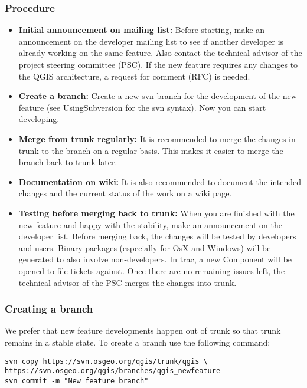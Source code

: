 \subsubsection{Procedure}
\begin{itemize}
\item \textbf{Initial announcement on mailing list:}
Before starting, make an announcement on the developer mailing list to see if
another developer is already working on the same feature. Also contact the
technical advisor of the project steering committee (PSC). If the new feature
requires any changes to the QGIS architecture, a request for comment (RFC) is
needed. 

\item \textbf{Create a branch:} 
Create a new svn branch for the development of the new feature (see
UsingSubversion for the svn syntax). Now you can start developing.

\item \textbf{Merge from trunk regularly:}
It is recommended to merge the changes in trunk to the branch on a regular
basis. This makes it easier to merge the branch back to trunk later.

\item \textbf{Documentation on wiki:} 
It is also recommended to document the intended changes and the current status
of the work on a wiki page.

\item \textbf{Testing before merging back to trunk:} 
When you are finished with the new feature and happy with the stability, make
an announcement on the developer list.  Before merging back, the changes will
be tested by developers and users. Binary packages (especially for OsX and
Windows) will be generated to also involve non-developers. In trac, a new
Component will be opened to file tickets against.  Once there are no remaining
issues left, the technical advisor of the PSC merges the changes into trunk.

\end{itemize}


\subsubsection{Creating a branch}
We prefer that new feature developments happen out of trunk so that trunk
remains in a stable state. To create a branch use the following command:

\begin{verbatim}
svn copy https://svn.osgeo.org/qgis/trunk/qgis \
https://svn.osgeo.org/qgis/branches/qgis_newfeature
svn commit -m "New feature branch"
\end{verbatim}

